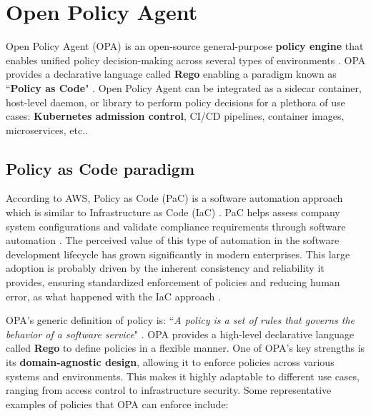 \section{Open Policy Agent}

Open Policy Agent (OPA) is an open-source general-purpose \textbf{policy engine} that enables unified policy decision-making across several types of environments \cite{opa_docs}. 
OPA provides a declarative language called \textbf{Rego} enabling a paradigm known as ``\textbf{Policy as Code}" \cite{opa_docs}.
Open Policy Agent can be integrated as a sidecar container, host-level daemon, or library to perform policy decisions for a plethora of use cases: \textbf{Kubernetes admission control}, CI/CD pipelines, container images, microservices, etc.\cite{opa_docs}. 

\subsection{Policy as Code paradigm}

According to AWS, Policy as Code (PaC) is a software automation approach which is similar to Infrastructure as Code (IaC) \cite{pac_aws}. 
PaC helps assess company system configurations and validate compliance requirements through software automation \cite{pac_aws}. 
The perceived value of this type of automation in the software development lifecycle has grown significantly in modern enterprises. 
This large adoption is probably driven by the inherent consistency and reliability it provides, ensuring standardized enforcement of policies and reducing human error, as what happened with the IaC approach \cite{pac_aws}.

OPA's generic definition of policy is: ``\textit{A policy is a set of rules that governs the behavior of a software service}" \cite{opa_philosophy}. OPA provides a high-level declarative language called \textbf{Rego} to define policies in a flexible manner. 
One of OPA's key strengths is its \textbf{domain-agnostic design}, allowing it to enforce policies across various systems and environments. 
This makes it highly adaptable to different use cases, ranging from access control to infrastructure security. 
Some representative examples of policies that OPA can enforce include:

